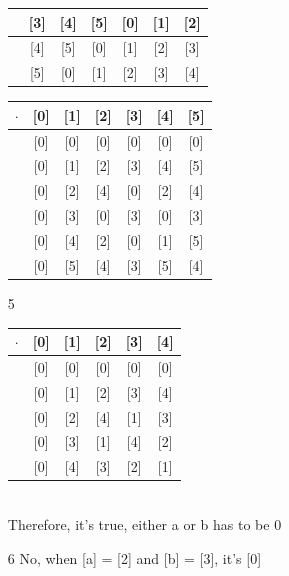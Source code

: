 \documentclass[12pt]{article}
\begin{document}
\begin{enumerate}
\begin{tabular}{c|c|c|c|c|c|c}
		\hline
		[3] & [3] & [4] & [5] & [0] & [1] & [2]\\
		\hline
		[4] & [4] & [5] & [0] & [1] & [2] & [3]\\
		\hline
		[5] & [5] & [0] & [1] & [2] & [3] & [4]\\
		\hline
	    \end{tabular}
	    \begin{tabular}{c|c|c|c|c|c|c}
		\hline
		$\cdot$ & [0] & [1] & [2] & [3] & [4] & [5]\\
		\hline
		[0] & [0] & [0] & [0] & [0] & [0] & [0]\\
		\hline
		[1] & [0] & [1] & [2] & [3] & [4] & [5]\\
		\hline
		[2] & [0] & [2] & [4] & [0] & [2] & [4]\\
		\hline
		[3] & [0] & [3] & [0] & [3] & [0] & [3]\\
		\hline
		[4] & [0] & [4] & [2] & [0] & [1] & [5]\\
		\hline
		[5] & [0] & [5] & [4] & [3] & [5] & [4]\\
		\hline
	    \end{tabular}
	\item [5]
	    \begin{tabular}{c|c|c|c|c|c}
		\hline
		$\cdot$ & [0] & [1] & [2] & [3] & [4]\\
		\hline
		[0] & [0] & [0] & [0] & [0] & [0]\\
		\hline
		[1] & [0] & [1] & [2] & [3] & [4]\\
		\hline
		[2] & [0] & [2] & [4] & [1] & [3]\\
		\hline
		[3] & [0] & [3] & [1] & [4] & [2]\\
		\hline
		[4] & [0] & [4] & [3] & [2] & [1]\\
		\hline
	    \end{tabular}
	    \\Therefore, it's true, either a or b has to be 0
	\item [6] No, when [a] = [2] and [b] = [3], it's [0]
\end{enumerate}
\end{document}
